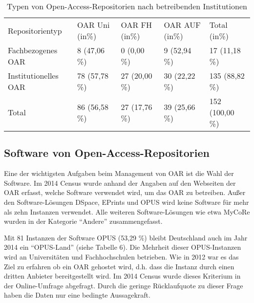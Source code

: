 \documentclass[a4paper,
fontsize=11pt,
oneside,
numbers=noperiodatend,
parskip=half-,
bibliography=totoc,
final
]{scrartcl}
\begin{document}
\begin{table}[ht]
\centering
\small
\begin{tabular}{lllll}
  \toprule
Repositorientyp &  OAR Uni (in\%)   & OAR FH (in\%)  & OAR AUF (in\%)  & Total (in\%) \\ 
     \cmidrule(r){1-1} \cmidrule(r){2-2} \cmidrule(r){3-3} \cmidrule(r){4-4} \cmidrule(r){5-5}
Fachbezogenes OAR & 8 (47,06 \%) & 0 (0,00 \%) & 9 (52,94 \%) & 17 (11,18 \%) \\ 
  Institutionelles OAR & 78 (57,78 \%) & 27 (20,00 \%) & 30 (22,22 \%) & 135 (88,82 \%) \\ 
     \cmidrule(r){1-1} \cmidrule(r){2-2} \cmidrule(r){3-3} \cmidrule(r){4-4} \cmidrule(r){5-5}
  Total & 86 (56,58 \%) & 27 (17,76 \%) & 39 (25,66 \%) & 152 (100,00 \%) \\ 
   \bottomrule
\end{tabular}
\caption{Typen von Open-Access-Repositorien nach betreibenden
Institutionen}
\end{table}

\subsection*{Software von
Open-Access-Repositorien}\label{software-von-open-access-repositorien}

Eine der wichtigsten Aufgaben beim Management von OAR ist die Wahl der
Software. Im 2014 Census wurde anhand der Angaben auf den Webseiten der
OAR erfasst, welche Software verwendet wird, um das OAR zu betreiben.
Außer den Software-Lösungen DSpace, EPrints und OPUS wird keine Software
für mehr als zehn Instanzen verwendet. Alle weiteren Software-Lösungen
wie etwa MyCoRe wurden in der Kategorie \enquote{Andere}
zusammengefasst.

Mit 81 Instanzen der Software OPUS (53,29 \%) bleibt Deutschland auch im
Jahr 2014 ein \enquote{OPUS-Land} (siehe Tabelle 6). Die Mehrheit dieser
OPUS-Instanzen wird an Universitäten und Fachhochschulen betrieben. Wie
in 2012 war es das Ziel zu erfahren ob ein OAR gehostet wird, d.h. dass
die Instanz durch einen dritten Anbieter bereitgestellt wird. Im 2014
Census wurde dieses Kriterium in der Online-Umfrage abgefragt. Durch die
geringe Rücklaufquote zu dieser Frage haben die Daten nur eine bedingte
Aussagekraft.
\end{document}
